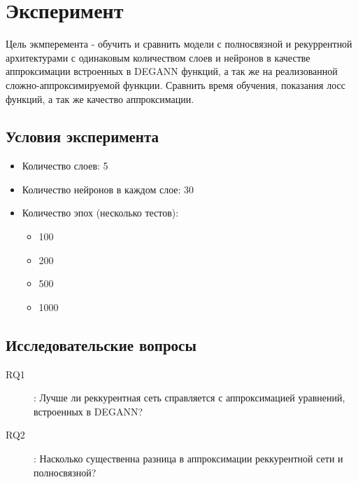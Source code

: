 
\section{Эксперимент}
Цель экмперемента - обучить и сравнить модели с полносвязной и рекуррентной архитектурами с одинаковым количеством слоев и нейронов в качестве аппроксимации встроенных в DEGANN функций, а так же на реализованной сложно-аппроксимируемой функции. Сравнить время обучения, показания лосс функций, а так же качество аппроксимации.

\subsection{Условия эксперимента}
\begin{itemize}
    \item Количество слоев: 5
    \item Количество нейронов в каждом слое: 30
    \item Количество эпох (несколько тестов):
    \begin{itemize}
        \item 100
        \item 200
        \item 500
        \item 1000
    \end{itemize}
\end{itemize}

\subsection{Исследовательские вопросы}
\begin{description}
    \item[RQ1]: Лучше ли реккурентная сеть справляется с аппроксимацией уравнений, встроенных в DEGANN?
    \item[RQ2]: Насколько существенна разница в аппроксимации реккурентной сети и полносвязной?
\end{description}


